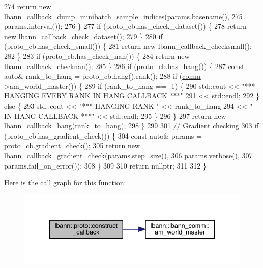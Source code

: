 \begin{DoxyCode}
274     \textcolor{keywordflow}{return} \textcolor{keyword}{new} lbann\_callback\_dump\_minibatch\_sample\_indices(params.basename(),
275                                                             params.interval());
276   \}
277   \textcolor{keywordflow}{if} (proto\_cb.has\_check\_dataset()) \{
278     \textcolor{keywordflow}{return} \textcolor{keyword}{new} lbann\_callback\_check\_dataset();
279   \}
280   \textcolor{keywordflow}{if} (proto\_cb.has\_check\_small()) \{
281     \textcolor{keywordflow}{return} \textcolor{keyword}{new} lbann\_callback\_checksmall();
282   \}
283   \textcolor{keywordflow}{if} (proto\_cb.has\_check\_nan()) \{
284     \textcolor{keywordflow}{return} \textcolor{keyword}{new} lbann\_callback\_checknan();
285   \}
286   \textcolor{keywordflow}{if} (proto\_cb.has\_hang()) \{
287     \textcolor{keyword}{const} \textcolor{keyword}{auto}& rank\_to\_hang = proto\_cb.hang().rank();
288     \textcolor{keywordflow}{if} (\hyperlink{file__io_8cpp_ab048c6f9fcbcfaa57ce68b00263dbebe}{comm}->am\_world\_master()) \{
289       \textcolor{keywordflow}{if} (rank\_to\_hang == -1) \{
290         std::cout << \textcolor{stringliteral}{"*** HANGING EVERY RANK IN HANG CALLBACK ***"}
291                   << std::endl;
292       \} \textcolor{keywordflow}{else} \{
293         std::cout << \textcolor{stringliteral}{"*** HANGING RANK "} << rank\_to\_hang
294                   << \textcolor{stringliteral}{" IN HANG CALLBACK ***"} << std::endl;
295       \}
296     \}
297     \textcolor{keywordflow}{return} \textcolor{keyword}{new} lbann\_callback\_hang(rank\_to\_hang);
298   \}
299 
301   \textcolor{comment}{// Gradient checking}
303 \textcolor{comment}{}  \textcolor{keywordflow}{if} (proto\_cb.has\_gradient\_check()) \{
304     \textcolor{keyword}{const} \textcolor{keyword}{auto}& params = proto\_cb.gradient\_check();
305     \textcolor{keywordflow}{return} \textcolor{keyword}{new} lbann\_callback\_gradient\_check(params.step\_size(),
306                                              params.verbose(),
307                                              params.fail\_on\_error());
308   \}
309 
310   \textcolor{keywordflow}{return} \textcolor{keyword}{nullptr};
311 
312 \}
\end{DoxyCode}
Here is the call graph for this function\+:\nopagebreak
\begin{figure}[H]
\begin{center}
\leavevmode
\includegraphics[width=340pt]{namespacelbann_1_1proto_a00597c8b7450c389847980cf6934a619_cgraph}
\end{center}
\end{figure}

